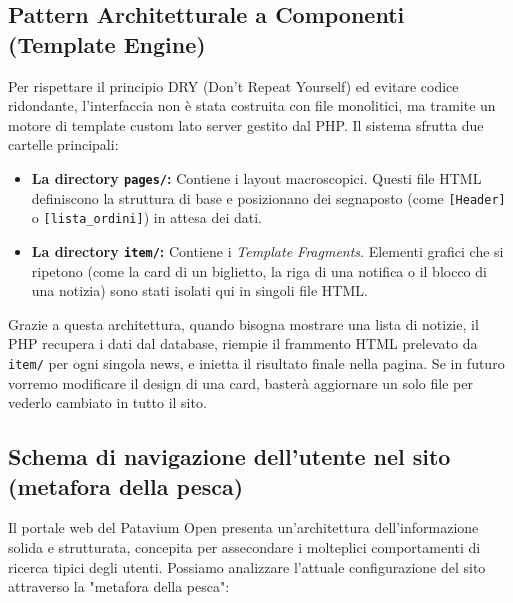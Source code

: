 \documentclass[11pt,a4paper]{article}
\begin{document}
\subsection{Pattern Architetturale a Componenti (Template Engine)}
Per rispettare il principio DRY (Don't Repeat Yourself) ed evitare codice ridondante, l'interfaccia non è stata costruita con file monolitici, ma tramite un motore di template custom lato server gestito dal PHP.
Il sistema sfrutta due cartelle principali:
\begin{itemize}
    \item \textbf{La directory \texttt{pages/}:} Contiene i layout macroscopici. Questi file HTML definiscono la struttura di base e posizionano dei segnaposto (come \texttt{[Header]} o \texttt{[lista\_ordini]}) in attesa dei dati.
    \item \textbf{La directory \texttt{item/}:} Contiene i \textit{Template Fragments}. Elementi grafici che si ripetono (come la card di un biglietto, la riga di una notifica o il blocco di una notizia) sono stati isolati qui in singoli file HTML.
\end{itemize}
Grazie a questa architettura, quando bisogna mostrare una lista di notizie, il PHP recupera i dati dal database, riempie il frammento HTML prelevato da \texttt{item/} per ogni singola news, e inietta il risultato finale nella pagina. Se in futuro vorremo modificare il design di una card, basterà aggiornare un solo file per vederlo cambiato in tutto il sito.

\subsection{Schema di navigazione dell'utente nel sito (metafora della pesca)}

Il portale web del Patavium Open presenta un'architettura dell'informazione solida e strutturata, concepita per assecondare i molteplici comportamenti di ricerca tipici degli utenti. Possiamo analizzare l'attuale configurazione del sito attraverso la "metafora della pesca":
\end{document}
